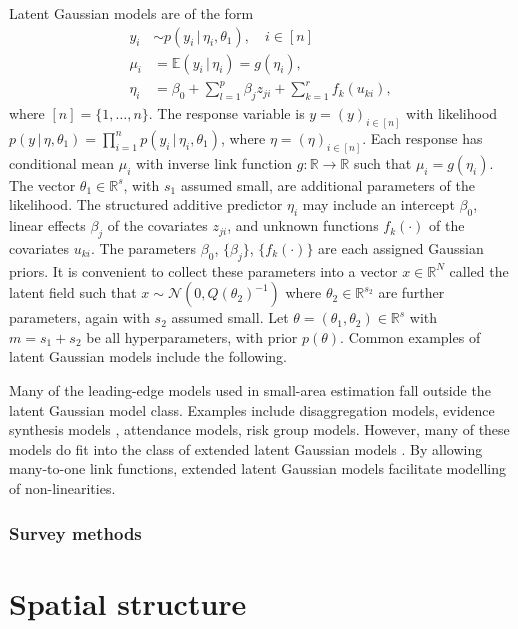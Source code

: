 \documentclass[a4paper, nobind]{templates/ociamthesis}
\begin{document}
Latent Gaussian models \autocite{rue2009approximate} are of the form
\begin{align*}
y_i &\sim p(y_i \, | \, \eta_i, \theta_1), \quad i \in [n]\\
\mu_i &= \mathbb{E}(y_i \, | \, \eta_i) = g(\eta_i), \\
\eta_i &= \beta_0 + \sum_{l = 1}^{p} \beta_j z_{ji} + \sum_{k = 1}^{r} f_k(u_{ki}),
\end{align*}
where \([n] = \{1, \ldots, n\}\).
The response variable is \(y = (y)_{i \in [n]}\) with likelihood \(p(y \, | \, \eta, \theta_1) = \prod_{i = 1}^n p(y_i \, | \, \eta_i, \theta_1)\), where \(\eta = (\eta)_{i \in [n]}\).
Each response has conditional mean \(\mu_i\) with inverse link function \(g: \mathbb{R} \to \mathbb{R}\) such that \(\mu_i = g(\eta_i)\).
The vector \(\theta_1 \in \mathbb{R}^s\), with \(s_1\) assumed small, are additional parameters of the likelihood.
The structured additive predictor \(\eta_i\) may include an intercept \(\beta_0\), linear effects \(\beta_j\) of the covariates \(z_{ji}\), and unknown functions \(f_k(\cdot)\) of the covariates \(u_{ki}\).
The parameters \(\beta_0\), \(\{\beta_j\}\), \(\{f_k(\cdot)\}\) are each assigned Gaussian priors.
It is convenient to collect these parameters into a vector \(x \in \mathbb{R}^N\) called the latent field such that \(x \sim \mathcal{N}(0, Q(\theta_2)^{-1})\) where \(\theta_2 \in \mathbb{R}^{s_2}\) are further parameters, again with \(s_2\) assumed small.
Let \(\theta = (\theta_1, \theta_2) \in \mathbb{R}^s\) with \(m = s_1 + s_2\) be all hyperparameters, with prior \(p(\theta)\).
Common examples of latent Gaussian models include the following.

Many of the leading-edge models used in small-area estimation fall outside the latent Gaussian model class.
Examples include disaggregation models, evidence synthesis models \autocite{eaton2019joint,eaton2021naomi}, attendance models, risk group models.
However, many of these models do fit into the class of extended latent Gaussian models \autocite{stringer2021fast}.
By allowing many-to-one link functions, extended latent Gaussian models facilitate modelling of non-linearities.

\hypertarget{survey-methods}{%
\subsection{Survey methods}\label{survey-methods}}

\hypertarget{beyond-borders}{%
\chapter{Spatial structure}\label{beyond-borders}}
\end{document}

